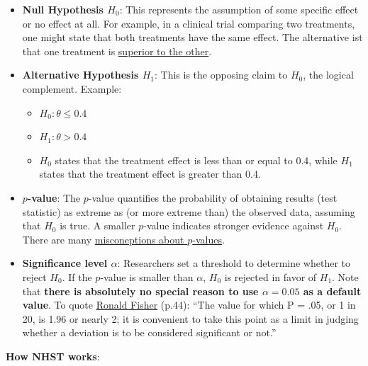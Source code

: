 \documentclass[
]{book}
\providecommand{\tightlist}{%
  \setlength{\itemsep}{0pt}\setlength{\parskip}{0pt}}
\begin{document}
\begin{itemize}
\item
  \textbf{Null Hypothesis \(H_0\)}: This represents the assumption of some specific effect or no effect at all.
  For example, in a clinical trial comparing two treatments, one might state that both treatments have the same effect.
  The alternative ist that one treatment is \href{https://en.wikipedia.org/wiki/Clinical_study_design\#Other_terms}{superior to the other}.
\item
  \textbf{Alternative Hypothesis \(H_1\)}: This is the opposing claim to \(H_0\), the logical complement.
  Example:

  \begin{itemize}
  \tightlist
  \item
    \(H_0: \theta \le 0.4\)
  \item
    \(H_1: \theta > 0.4\)
  \item
    \(H_0\) states that the treatment effect is less than or equal to 0.4,
    while \(H_1\) states that the treatment effect is greater than 0.4.
  \end{itemize}
\item
  \textbf{\(p\)-value}: The \(p\)-value quantifies the probability of obtaining results (test statistic) as extreme as (or more extreme than)
  the observed data, assuming that \(H_0\) is true.
  A smaller \(p\)-value indicates stronger evidence against \(H_0\).
  There are many \href{https://sixsigmadsi.com/wp-content/uploads/2020/10/A-Dirty-Dozen-Twelve-P-Value-Misconceptions.pdf}{misconeptions about \(p\)-values}.
\item
  \textbf{Significance level \(\alpha\)}: Researchers set a threshold to determine whether to reject \(H_0\).
  If the \(p\)-value is smaller than \(\alpha\), \(H_0\) is rejected in favor of \(H_1\).
  Note that \textbf{there is absolutely no special reason to use \(\alpha = 0.05\) as a default value}.
  To quote \href{https://link.springer.com/chapter/10.1007/978-1-4612-4380-9_6}{Ronald Fisher} (p.44):
  ``The value for which P = .05, or 1 in 20, is 1.96 or nearly 2; it is convenient to take this
  point as a limit in judging whether a deviation is to be considered significant or not.''
\end{itemize}

\textbf{How NHST works}:
\end{document}
